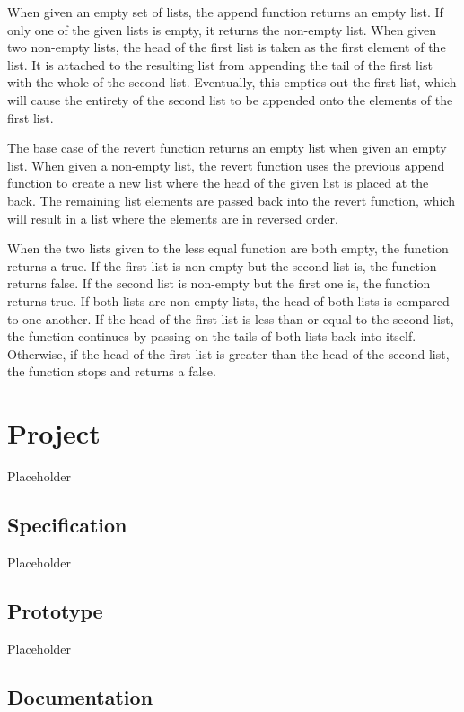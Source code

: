 \documentclass{article}
\theoremstyle{theorem}
\theoremstyle{definition}
\theoremstyle{remark}
\begin{document}
\medskip\noindent
When given an empty set of lists, the append function returns an empty list. If only one of the given lists is empty, it returns the non-empty list. When given two non-empty lists, the head of the first list is taken as the first element of the list. It is attached to the resulting list from appending the tail of the first list with the whole of the second list. Eventually, this empties out the first list, which will cause the entirety of the second list to be appended onto the elements of the first list.

\medskip\noindent
The base case of the revert function returns an empty list when given an empty list. When given a non-empty list, the revert function uses the previous append function to create a new list where the head of the given list is placed at the back. The remaining list elements are passed back into the revert function, which will result in a list where the elements are in reversed order.

\medskip\noindent
When the two lists given to the less equal function are both empty, the function returns a true. If the first list is non-empty but the second list is, the function returns false. If the second list is non-empty but the first one is, the function returns true. If both lists are non-empty lists, the head of both lists is compared to one another. If the head of the first list is less than or equal to the second list, the function continues by passing on the tails of both lists back into itself. Otherwise, if the head of the first list is greater than the head of the second list, the function stops and returns a false.

\section{Project}

Placeholder

\subsection{Specification}

Placeholder

\subsection{Prototype}

Placeholder

\subsection{Documentation}
\end{document}

